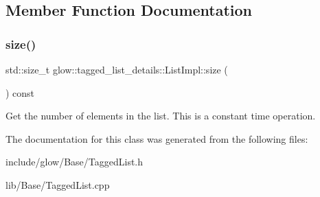 \subsection{Member Function Documentation}
\mbox{\label{classglow_1_1tagged__list__details_1_1_list_impl_a8f8ca87a01546e1cde4e0ded60f64b57}} 
\subsubsection{\texorpdfstring{size()}{size()}}
{\footnotesize\ttfamily std\+::size\+\_\+t glow\+::tagged\+\_\+list\+\_\+details\+::\+List\+Impl\+::size (\begin{DoxyParamCaption}{ }\end{DoxyParamCaption}) const\hspace{0.3cm}{\ttfamily [inline]}}

Get the number of elements in the list. This is a constant time operation. 

The documentation for this class was generated from the following files\+:\begin{DoxyCompactItemize}
\item 
include/glow/\+Base/Tagged\+List.\+h\item 
lib/\+Base/Tagged\+List.\+cpp\end{DoxyCompactItemize}
